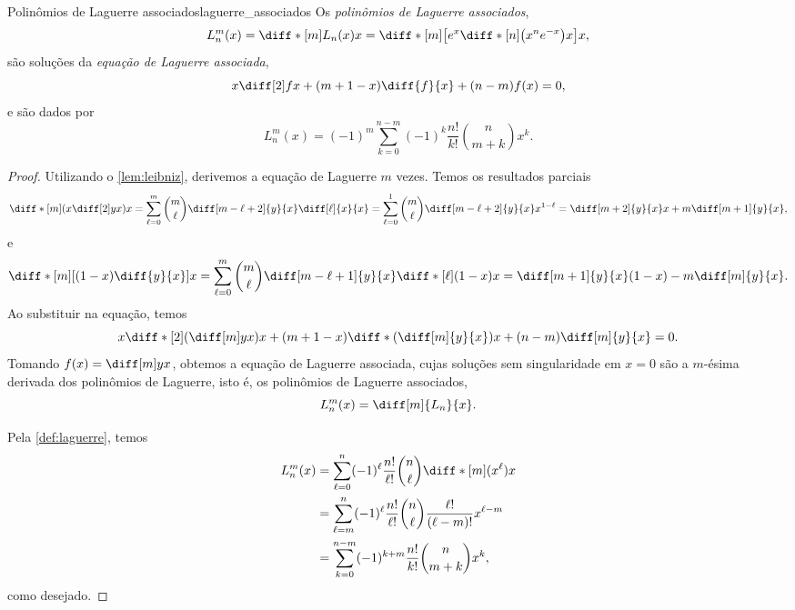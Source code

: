 \begin{proposition}{Polinômios de Laguerre associados}{laguerre_associados}
    Os \emph{polinômios de Laguerre associados},
    \begin{equation*}
        L_n^m(x) = \diff*[m]{L_n(x)}{x} = \diff*[m]{\left[e^x\diff*[n]{\left(x^ne^{-x}\right)}{x}\right]}{x},
    \end{equation*}
    são soluções da \emph{equação de Laguerre associada},
    \begin{equation*}
        x\diff[2]fx + (m+1 - x)\diff{f}{x} + (n-m) f(x) = 0,
    \end{equation*}
    e são dados por
    \begin{equation*}
        L_n^m(x) = (-1)^m \sum_{k = 0}^{n-m} (-1)^k \frac{n!}{k!} \binom{n}{m+k}x^k.
    \end{equation*}
\end{proposition}
\begin{proof}
    Utilizando o \cref{lem:leibniz}, derivemos a equação de Laguerre \(m\) vezes. Temos os resultados parciais
    \begin{equation*}
        \diff*[m]{\left(x\diff[2]yx\right)}{x} = \sum_{\ell = 0}^m \binom{m}{\ell} \diff[m - \ell + 2]{y}{x} \diff[\ell]{x}{x} = \sum_{\ell = 0}^1 \binom{m}{\ell} \diff[m-\ell+2]{y}{x}x^{1-\ell} = \diff[m+2]{y}{x}x + m\diff[m+1]{y}{x},
    \end{equation*}
    e
    \begin{equation*}
        \diff*[m]{\left[(1-x)\diff{y}{x}\right]}{x} = \sum_{\ell = 0}^{m}\binom{m}{\ell} \diff[m-\ell+1]{y}{x} \diff*[\ell]{(1-x)}{x} = \diff[m+1]{y}{x}(1-x) - m\diff[m]{y}{x}.
    \end{equation*}
    Ao substituir na equação, temos
    \begin{equation*}
        x \diff*[2]{\left(\diff[m]yx\right)}{x} + (m + 1 - x) \diff*{\left(\diff[m]{y}{x}\right)}{x} + (n - m)\diff[m]{y}{x} = 0.
    \end{equation*}
    Tomando \(f(x) = \diff[m]yx\), obtemos a equação de Laguerre associada, cujas soluções sem singularidade em \(x = 0\) são a \(m\)-ésima derivada dos polinômios de Laguerre, isto é, os polinômios de Laguerre associados,
    \begin{equation*}
        L_n^m(x) = \diff[m]{L_n}{x}.
    \end{equation*}

    Pela \cref{def:laguerre}, temos
    \begin{align*}
        L_n^m(x) &= \sum_{\ell = 0}^{n} (-1)^\ell \frac{n!}{\ell!} \binom{n}{\ell} \diff*[m]{(x^\ell)}{x}\\
                 &= \sum_{\ell = m}^{n} (-1)^\ell \frac{n!}{\ell!} \binom{n}{\ell} \frac{\ell!}{(\ell - m)!}x^{\ell - m}\\
                 &= \sum_{k = 0}^{n-m} (-1)^{k + m} \frac{n!}{k!} \binom{n}{m+k} x^{k},
    \end{align*}
    como desejado.
\end{proof}
